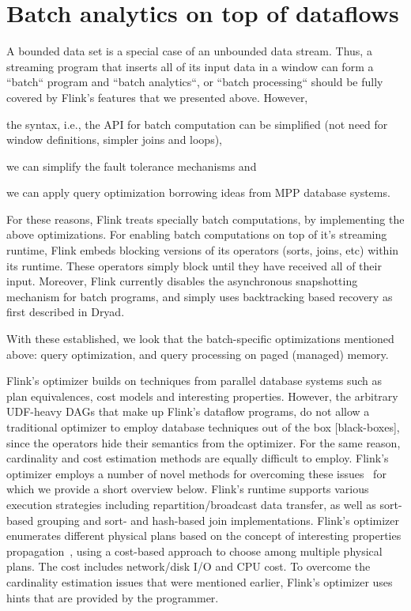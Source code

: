 
\section{Batch analytics on top of dataflows}
\label{sec:batch}
A bounded data set is a special case of an unbounded data stream. Thus, a streaming program that inserts all of its input data in a window can form a ``batch`` program and ``batch analytics``, or ``batch processing`` should be fully covered by Flink's features that we presented above. However, \begin{inparaenum}[i)]
  \item the syntax, i.e., the API for batch computation can be simplified (not need for window definitions, simpler joins and loops),
  \item we can simplify the fault tolerance mechanisms and
  \item we can apply query optimization borrowing ideas from MPP database systems.
\end{inparaenum}
For these reasons, Flink treats specially batch computations, by implementing the above optimizations. For enabling batch computations on top of it's streaming runtime, Flink embeds blocking versions of its operators (sorts, joins, etc) within its runtime. These operators simply block until they have received all of their input. Moreover, Flink currently disables the asynchronous snapshotting mechanism for batch programs, and simply uses backtracking based recovery as first described in Dryad.~\cite{isard2007dryad}

With these established, we look that the batch-specific optimizations mentioned above: query optimization, and query processing on paged (managed) memory.

 Flink's optimizer builds on techniques from parallel database systems such as plan equivalences, cost models and interesting properties. However, the arbitrary UDF-heavy DAGs that make up Flink's dataflow programs, do not allow a traditional optimizer to employ database techniques out of the box [black-boxes], since the operators hide their semantics from the optimizer. For the same reason, cardinality and cost estimation methods are equally difficult to employ. Flink's optimizer employs a number of novel methods for overcoming these issues~\cite{blackBoxes, stratosphere, DBLP:journals/pvldb/EwenTKM12} for which we provide a short overview below. Flink's runtime supports various execution strategies including repartition/broadcast data transfer, as well as sort-based grouping and sort- and hash-based join implementations. Flink's optimizer enumerates different physical plans based on the concept of interesting properties propagation~\cite{scopeOptimizer}, using a cost-based approach to choose among multiple physical plans. The cost includes network/disk I/O and CPU cost. To overcome the cardinality estimation issues that were mentioned earlier, Flink's optimizer uses hints that are provided by the programmer.

